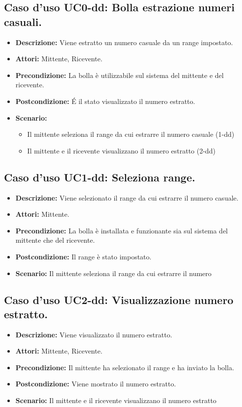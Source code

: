 \subsection{Caso d'uso UC0-dd: Bolla estrazione numeri casuali.}
\begin{itemize}
\item[]\textbf{Descrizione:} Viene estratto un numero casuale da un range impostato.
\item[]\textbf{Attori:} Mittente, Ricevente. 
\item[]\textbf{Precondizione:} La bolla è utilizzabile sul sistema del mittente e del ricevente. 
\item[]\textbf{Postcondizione:} \'E il stato visualizzato il numero estratto. 
\item[]\textbf{Scenario:}
\begin{itemize}
\item Il mittente seleziona il range da cui estrarre il numero casuale (1-dd)
\item Il mittente e il ricevente visualizzano il numero estratto (2-dd)
\end{itemize} 
\end{itemize}

\subsection{Caso d'uso UC1-dd: Seleziona range.}
\begin{itemize}
\item[]\textbf{Descrizione:} Viene selezionato il range da cui estrarre il numero casuale.
\item[]\textbf{Attori:} Mittente. 
\item[]\textbf{Precondizione:} La bolla è installata e funzionante sia sul sistema del mittente che del ricevente. 
\item[]\textbf{Postcondizione:} Il range è stato impostato. 
\item[]\textbf{Scenario:}
Il mittente seleziona il range da cui estrarre il numero 
\end{itemize}

\subsection{Caso d'uso UC2-dd: Visualizzazione numero estratto.}
\begin{itemize}
\item[]\textbf{Descrizione:} Viene visualizzato il numero estratto.
\item[]\textbf{Attori:} Mittente, Ricevente. 
\item[]\textbf{Precondizione:} Il mittente ha selezionato il range e ha inviato la bolla. 
\item[]\textbf{Postcondizione:} Viene mostrato il numero estratto. 
\item[]\textbf{Scenario:}
Il mittente e il ricevente visualizzano il numero estratto 
\end{itemize}

